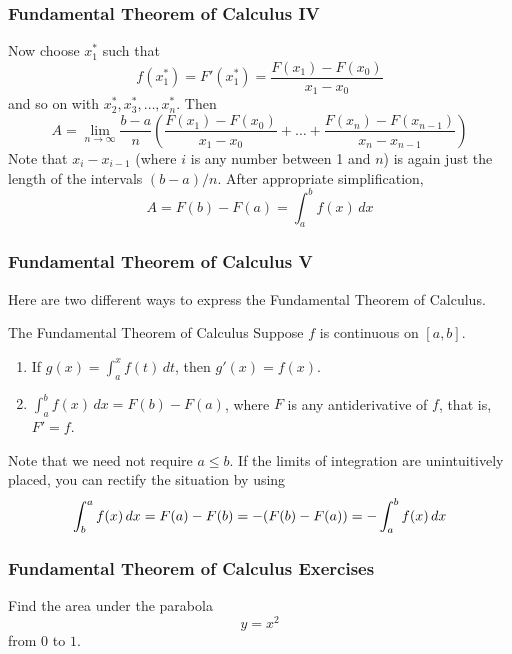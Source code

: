 \documentclass[xcolor=dvipsnames]{beamer}
\begin{document}
\begin{frame}
  \frametitle{Fundamental Theorem of Calculus IV}
Now choose $x_{1}^{*}$ such that 
\begin{equation}
  \label{eq:bicochoh}
  f(x_{1}^{*})=F'(x_{1}^{*})=\frac{F(x_{1})-F(x_{0})}{x_{1}-x_{0}}
\end{equation}
and so on with $x_{2}^{*},x_{3}^{*},\ldots,x_{n}^{*}$. Then
\begin{equation}
  \label{eq:chabahxo}
  A=\lim_{n\rightarrow\infty}\frac{b-a}{n}\left(\frac{F(x_{1})-F(x_{0})}{x_{1}-x_{0}}+\ldots+\frac{F(x_{n})-F(x_{n-1})}{x_{n}-x_{n-1}}\right)
\end{equation}
Note that $x_{i}-x_{i-1}$ (where $i$ is any number between 1 and $n$)
is again just the length of the intervals $(b-a)/n$. After appropriate
simplification,
\begin{equation}
  \label{eq:ovooleek}
  A=F(b)-F(a)=\int_{a}^{b}f(x)\,dx
\end{equation}
\end{frame}

\begin{frame}
  \frametitle{Fundamental Theorem of Calculus V}
Here are two different ways to express the Fundamental Theorem of
Calculus.
\begin{block}{The Fundamental Theorem of Calculus}
  Suppose $f$ is continuous on $[a,b]$.
  \begin{enumerate}
  \item If $g(x)=\int_{a}^{x}f(t)\,dt$, then $g'(x)=f(x)$.
  \item $\int_{a}^{b}f(x)\,dx=F(b)-F(a)$, where $F$ is any
    antiderivative of $f$, that is, $F'=f$.
  \end{enumerate}
\end{block}
Note that we need not require $a\leq{}b$. If the limits of integration
are unintuitively placed, you can rectify the situation by using 
\begin{equation}
  \label{eq:vichujai}
  \int_{b}^{a}f(x)\,dx=F(a)-F(b)=-(F(b)-F(a))=-\int_{a}^{b}f(x)\,dx\notag
\end{equation}
\end{frame}

\begin{frame}
  \frametitle{Fundamental Theorem of Calculus Exercises}
{\ubung} Find the area under the parabola
\begin{equation}
  \label{eq:veigheph}
  y=x^{2}
\end{equation}
from $0$ to $1$.
\end{frame}
\end{document}
